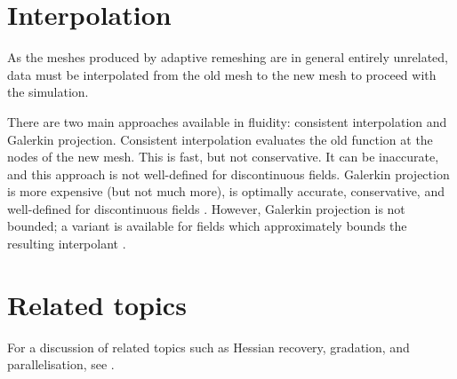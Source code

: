 \section{Interpolation} \label{sec:interpolation}
As the meshes produced by adaptive remeshing are in general entirely
unrelated, data must be interpolated from the old mesh to the new mesh
to proceed with the simulation.

There are two main approaches available in fluidity: consistent interpolation
and Galerkin projection. Consistent interpolation evaluates the old function
at the nodes of the new mesh. This is fast, but not conservative. It can be inaccurate,
and this approach is not well-defined for discontinuous fields.
Galerkin projection is more expensive (but not much more), is optimally accurate,
conservative, and well-defined for discontinuous fields \citep{farrell2009i}.
However, Galerkin projection is not bounded; a variant is available for \Pone fields
which approximately bounds the resulting interpolant \citep{farrell2009a}.

\section{Related topics} \label{sec:adaptivity_related_topics}
For a discussion of related topics such as Hessian recovery, gradation, and parallelisation,
see \citep{farrell2009i}.
